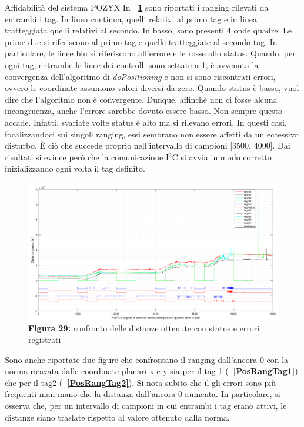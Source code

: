 \documentclass[12pt]{report}
\begin{document}
\begin{section}{Affidabilità del sistema POZYX}
		In \textbf{\figurename~\ref{ConfDist}} sono riportati i ranging rilevati da entrambi i tag. In linea continua, quelli relativi al primo tag e in linea tratteggiata quelli relativi al secondo.
		In basso, sono presenti 4 onde quadre. Le prime due si riferiscono al primo tag e quelle tratteggiate al secondo tag.
		In particolare, le linee blu si riferiscono all’errore e le rosse allo status.
		Quando, per ogni tag, entrambe le linee dei controlli sono settate a 1, è avvenuta la convergenza dell’algoritmo di \textit{doPositioning} e  non  si sono riscontrati errori, ovvero le coordinate assumono valori diversi da zero. Quando status è basso, vuol dire che l’algoritmo non è convergente. Dunque, affinchè non 			ci fosse alcuna incongruenza, anche l’errore sarebbe dovuto essere basso. 
		Non sempre questo accade. Infatti, svariate volte status è alto ma si rilevano errori. 
		In questi casi, focalizzandoci sui singoli ranging, essi sembrano non essere affetti da un eccessivo disturbo. 
		È ciò che succede proprio nell’intervallo di campioni [3500, 4000].
		Dai risultati si evince però che la comunicazione I$^2$C si avvia in modo corretto inizializzando ogni volta il tag definito.\\
		\begin{figure}[H]
			\centering
			\includegraphics[scale=0.17]{ConfDist}
			\caption{\textbf{Figura 29:} confronto delle distanze ottenute con status e errori registrati\label{ConfDist}}
		\end{figure} 
		Sono anche riportate due figure che confrontano il ranging dall’ancora 0 con la norma ricavata dalle coordinate planari x e y sia per il tag 1 (\textbf{\figurename~\ref{PosRangTag1}}) che per il tag2 (\textbf{\figurename~\ref{PosRangTag2}}). 
		Si nota subito che il gli errori sono più frequenti man mano che la distanza dall’ancora 0 aumenta. In particolare, si osserva che, per un intervallo di campioni in cui entrambi i tag erano attivi, le distanze siano traslate rispetto al valore ottenuto dalla norma.\\

\end{section}
\end{document}
